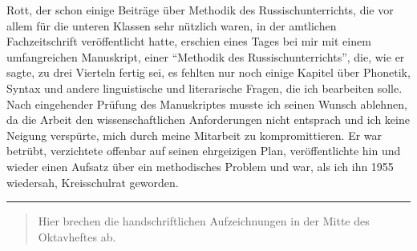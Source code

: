 Rott, der schon einige Beiträge über Methodik des Russischunterrichts, die vor allem für die unteren Klassen sehr nützlich waren, in der amtlichen Fachzeitschrift veröffentlicht hatte, erschien eines Tages bei mir mit einem umfangreichen Manuskript, einer \enquote{Methodik des Russischunterrichts}, die, wie er sagte, zu drei Vierteln fertig sei, es fehlten nur noch einige Kapitel über Phonetik, Syntax und andere linguistische und literarische Fragen, die ich bearbeiten solle. Nach eingehender Prüfung des Manuskriptes musste ich seinen Wunsch ablehnen, da die Arbeit den wissenschaftlichen Anforderungen nicht entsprach und ich keine Neigung verspürte, mich durch meine Mitarbeit zu kompromittieren. Er war betrübt, verzichtete offenbar auf seinen ehrgeizigen Plan, veröffentlichte hin und wieder einen Aufsatz über ein methodisches Problem und war, als ich ihn 1955 wiedersah, Kreisschulrat geworden.\\

\noindent\rule{12cm}{0.4pt}

\begin{quote}
\noindent Hier brechen die handschriftlichen Aufzeichnungen in der Mitte des Oktavheftes ab.
\end{quote}
